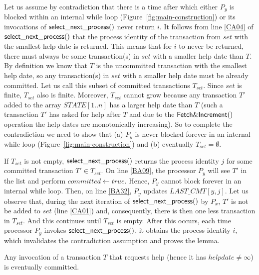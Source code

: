 \begin{proofL}
Let us assume by contradiction that there is a time after which
either $P_y$ is blocked within an internal while loop 
(Figure~\ref{fig:main-construction})  or its
invocations of ${\sf select\_next\_process}()$   never  return $i$. 
It follows from line \ref{CA04} of ${\sf  select\_next\_process}()$  that
the process identity  of the transaction from $set$  with the smallest help
date is returned. 
This means  that for $i$  to never be  returned, there must always  be some 
transaction(s) in $set$ with a smaller help date than $T$. 
By  definition we know  that $T$  is the  uncommitted transaction  with the
smallest help date, so any transaction(s) in $set$ with a smaller help date
must be  already committed. 
Let us call  this subset of committed  transactions  $T_{set}$. 
Since $set$ is finite, $T_{set}$ also is  finite.  
Moreover,   $T_{set}$ cannot grow because any  transaction $T'$ added to
the array $\mathit{STATE}[1..n]$ has  a larger help date than $T$
(such a transaction $T'$ has  asked for help after $T$
and  due to the  ${\sf Fetch\&Increment}()$  operation the  help  dates 
are  monotonically increasing).  
So  to complete  the contradiction  we  need to  show that 
(a) $P_y$  is never blocked forever in an internal while loop 
(Figure~\ref{fig:main-construction})
and (b) eventually $T_{set} = \emptyset$. 

If $T_{set}$  is not empty, ${\sf  select\_next\_process}()$  returns
the process identity $j$ for some committed transaction $T'\in T_{set}$. 
On line  \ref{BA09}, the processor 
$P_y$ will see $T'$  in the list and perform $committed \gets true$. 
Hence, $P_y$ cannot block forever in an internal while loop. 
Then, on line \ref{BA32}, $P_y$  updates  $\mathit{LAST\_CMT}[y,j]$.
Let  us   observe  that,  during  the   next   iteration   of  
${\sf select\_next\_process}()$ by $P_x$,  $T'$ is not be added to  $set$ 
(line  \ref{CA01}) and, consequently, 
there is then  one less  transaction in $T_{set}$. And this
continues until $T_{set}$ is empty.  After this occurs,   
each time processor $P_y$ invokes ${\sf  select\_next\_process}()$,  it
obtains the process identity $i$, which invalidates the contradiction 
assumption and proves the lemma. 
\renewcommand{\toto}{lemma:help-commit-1}
\end{proofL}


\begin{lemma}
\label{lemma:helped-transaction}
Any invocation of a transaction $T$ that requests help 
(hence it has $helpdate \neq \infty$) is eventually committed.
\end{lemma}

